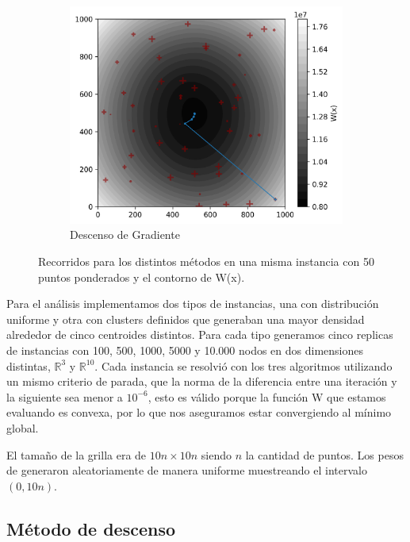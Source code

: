 \documentclass[10pt]{article}
\begin{document}
\begin{figure}[htbp]
	\begin{subfigure}[t]{0.4\textwidth}
		\centering
		\includegraphics[width=\linewidth]{figuras/recorrido_dg_8.png}
		\caption{Descenso de Gradiente}
	\end{subfigure}
	\caption{Recorridos para los distintos métodos en una misma instancia con 50 puntos ponderados y el contorno de W(x).}
	\label{fig:recorridos_instancia_8}
\end{figure}


Para el análisis implementamos dos tipos de instancias, una con distribución uniforme y otra con clusters definidos que generaban una mayor densidad alrededor de cinco centroides distintos. Para cada tipo generamos cinco replicas de instancias con 100, 500, 1000, 5000 y 10.000 nodos en dos dimensiones distintas, $\mathbb{R}^3$ y $\mathbb{R}^{10}$. Cada instancia se resolvió con los tres algoritmos utilizando un mismo criterio de parada, que la norma de la diferencia entre una iteración y la siguiente sea menor a $10^{-6}$, esto es válido porque la función W que estamos evaluando es convexa, por lo que nos aseguramos estar convergiendo al mínimo global.

El tamaño de la grilla era de $10n \times 10n$ siendo $n$ la cantidad de puntos. Los pesos de generaron aleatoriamente de manera uniforme muestreando el intervalo $(0, 10n)$.

\subsection{Método de descenso}
\end{document}
